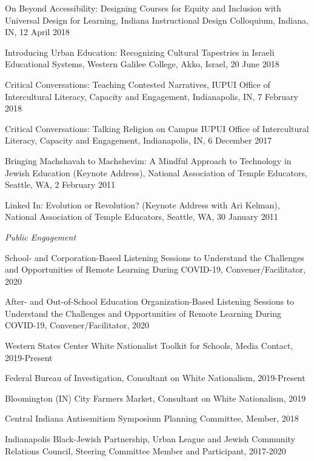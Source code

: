 \documentclass[11pt,article,oneside]{memoir}
\begin{document}
\ind On Beyond Accessibility: Designing Courses for Equity and Inclusion with Universal Design for Learning, Indiana Instructional Design Colloquium, Indiana, IN, 12 April 2018

\ind Introducing Urban Education: Recognizing Cultural Tapestries in Israeli Educational Systems, Western Galilee College, Akko, Israel, 20 June 2018

\ind Critical Conversations: Teaching Contested Narratives, IUPUI Office of Intercultural Literacy, Capacity and Engagement, Indianapolis, IN, 7 February 2018

\ind Critical Conversations: Talking Religion on Campus	IUPUI Office of Intercultural Literacy, Capacity and Engagement, Indianapolis, IN, 6 December 2017

\ind Bringing Machshavah to Machshevim: A Mindful Approach to Technology in Jewish Education (Keynote Address),	National Association of Temple Educators, Seattle, WA, 2 February 2011

\ind Linked In: Evolution or Revolution? (Keynote Address with Ari Kelman), National Association of Temple Educators, Seattle, WA, 30 January 2011

\medskip

\noindent\emph{Public Engagement \vspace{0.01in}}

\ind School- and Corporation-Based Listening Sessions to Understand the Challenges and Opportunities of Remote Learning During COVID-19, Convener/Facilitator, 2020

\ind After- and Out-of-School Education Organization-Based Listening Sessions to Understand the Challenges and Opportunities of Remote Learning During COVID-19, Convener/Facilitator, 2020

\ind Western States Center White Nationalist Toolkit for Schools, Media Contact, 2019-Present

\ind Federal Bureau of Investigation, Consultant on White Nationalism, 2019-Present

\ind Bloomington (IN) City Farmers Market, Consultant on White Nationalism, 2019

\ind Central Indiana Antisemitism Symposium Planning Committee, Member, 2018

\ind Indianapolis Black-Jewish Partnership, Urban League and Jewish Community Relations Council, Steering Committee Member and Participant, 2017-2020
\end{document}
